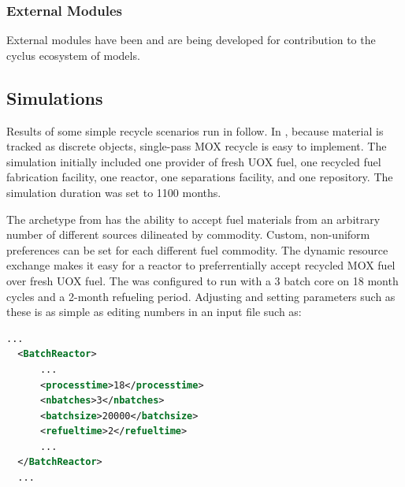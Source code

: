 \subsubsection{External Modules}
External modules have been 
\cite{cyder,separations,streamblender,mktdriveninst,commodconverter} and are 
being \cite{britelite,utk} developed for contribution to the cyclus ecosystem 
of models. 



\subsection{Simulations}



Results of some simple recycle scenarios run in \Cyclus follow.  In \Cyclus,
because material is tracked as discrete objects, single-pass MOX recycle is
easy to implement.  The simulation initially included one provider of fresh
UOX fuel, one recycled fuel fabrication facility, one reactor, one separations
facility, and one repository. The simulation duration was set to 1100 months.

The  archetype from \Cycamore has the ability to accept
fuel materials from an arbitrary number of different sources dilineated by
commodity. Custom, non-uniform preferences can be set for each different fuel
commodity.  The dynamic resource exchange makes it easy for a reactor to
preferrentially accept recycled MOX fuel over fresh UOX fuel.  The
 was configured to run with a 3 batch core on 18 month cycles and
a 2-month refueling period.  Adjusting and setting parameters such as these is
as simple as editing numbers in an input file such as:

\begin{lstlisting}[language=xml]
  ...
  <BatchReactor>
      ...
      <processtime>18</processtime>
      <nbatches>3</nbatches>
      <batchsize>20000</batchsize>
      <refueltime>2</refueltime>
      ...
  </BatchReactor>
  ...
\end{lstlisting}

